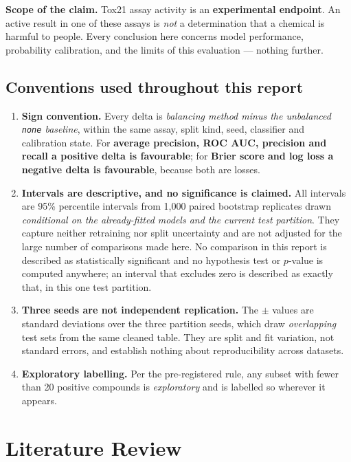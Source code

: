 \documentclass[10pt,letterpaper]{article}
\newcommand{\pmx}{$\pm$}
\begin{document}
\textbf{Scope of the claim.} Tox21 assay activity is an \textbf{experimental endpoint}. An active
result in one of these assays is \emph{not} a determination that a chemical is harmful to people.
Every conclusion here concerns model performance, probability calibration, and the limits of this
evaluation --- nothing further.

\subsection{Conventions used throughout this report}
\label{sec:conventions}

\begin{enumerate}\setlength{\itemsep}{1pt}
\item \textbf{Sign convention.} Every delta is \emph{balancing method minus the unbalanced
\texttt{none} baseline}, within the same assay, split kind, seed, classifier and calibration state.
For \textbf{average precision, ROC AUC, precision and recall a positive delta is favourable}; for
\textbf{Brier score and log loss a negative delta is favourable}, because both are losses.
\item \textbf{Intervals are descriptive, and no significance is claimed.} All intervals are 95\%
percentile intervals from 1{,}000 paired bootstrap replicates drawn \emph{conditional on the
already-fitted models and the current test partition}. They capture neither retraining nor split
uncertainty and are not adjusted for the large number of comparisons made here. No comparison in
this report is described as statistically significant and no hypothesis test or $p$-value is
computed anywhere; an interval that excludes zero is described as exactly that, in this one test
partition.
\item \textbf{Three seeds are not independent replication.} The \pmx{} values are standard
deviations over the three partition seeds, which draw \emph{overlapping} test sets from the same
cleaned table. They are split and fit variation, not standard errors, and establish nothing about
reproducibility across datasets.
\item \textbf{Exploratory labelling.} Per the pre-registered rule, any subset with fewer than 20
positive compounds is \emph{exploratory} and is labelled so wherever it appears.
\end{enumerate}

\section{Literature Review}
\end{document}
